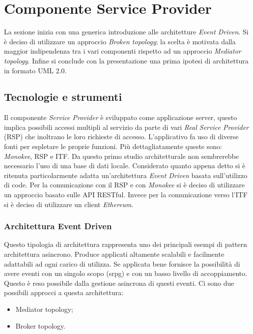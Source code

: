 \newpage
\section{Componente Service Provider}
La sezione inizia con una generica introduzione alle architetture \emph{Event Driven}. Si è deciso di utilizzare un approccio \emph{Broken topology}; la scelta è motivata dalla maggior indipendenza tra i vari componenti rispetto ad un approccio \emph{Mediator topology}. Infine si conclude con la presentazione una prima ipotesi di architettura in formato UML 2.0.



\subsection{Tecnologie e strumenti}
\label{sec:tecnologie-strumenti}
Il componente \emph{Service Provider} è sviluppato come applicazione server, questo implica possibili accessi multipli al servizio da parte di vari \emph{Real Service Provider} (RSP) che inoltrano le loro richieste di accesso. L’applicativo fa uso di diverse fonti per espletare le proprie funzioni. Più dettagliatamente queste sono: \emph{Monokee}, RSP e ITF. Da questo primo studio architetturale non sembrerebbe necessario l’uso di una base di dati locale.  Considerato quanto appena detto si è ritenuta particolarmente adatta un’architettura \emph{Event Driven} basata sull’utilizzo di code. Per la comunicazione con il RSP e con \emph{Monokee} si è deciso di utilizzare un approccio basato sulle API RESTful. Invece per la comunicazione verso l’ITF si è deciso di utilizzare un client \emph{Ethereum}.

\subsubsection{Architettura Event Driven}
Questo tipologia di architettura rappresenta uno dei principali esempi di pattern architettura asincrono. Produce applicati altamente scalabili e facilmente adattabili ad ogni carico di utilizza. Se applicata bene fornisce la possibilità di avere eventi con un singolo scopo (\gls{srpg}\glsfirstoccur) e con un basso livello di accoppiamento. Questo è reso possibile dalla gestione asincrona di questi eventi.
Ci sono due possibili approcci a questa architettura:
\begin{itemize}
    \item Mediator topology;
    \item Broker topology.
\end{itemize}
